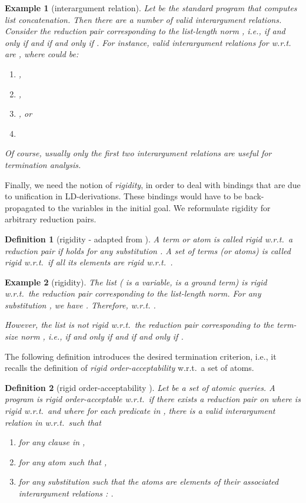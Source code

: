 \documentclass[envcountsame]{tlp}
\newcounter{ex:der-lastsymconsctr}
\newtheorem{definition}{Definition}
\newtheorem{example}{Example}
\begin{document}
\begin{example}[interargument relation]\label{exam:interagr}
Let  be the 
standard  program that computes list concatenation. Then
there are a number of valid interargument
relations. Consider the reduction
pair  corresponding to the list-length norm ,
i.e.,  if and only if  and  if and only if
.
For instance, valid 
interargument relations for  w.r.t.  are 
 , where  could be:
\begin{enumerate}
\item[-] ,
\item[-] ,
\item[-] , or
\item[-] 
\end{enumerate}
Of course, usually only the first two interargument relations
are useful for termination analysis.
{\hfill{}}
\end{example}
 

Finally, we need the notion of \emph{rigidity}, in order to deal with
bindings that are due to 
unification in LD-derivations. These bindings would have to be back-propagated
to the variables in the initial goal. We reformulate rigidity for arbitrary reduction
pairs.

\begin{definition}[rigidity - adapted from \cite{DeSchreyeSerebrenik01}] \label{def:rigidity}
A term or atom  is called \emph{rigid}
w.r.t.\ a reduction pair  if  holds for any
substitution . A set of terms (or atoms)  is called \emph{rigid}
w.r.t.\  if all its elements are rigid w.r.t.\ .
\end{definition}

\begin{example}[rigidity]\label{exam:rigidity}
The list  ( is a variable,  is a ground term) is rigid w.r.t.\ the reduction
pair  corresponding to the list-length norm.
For any substitution
, we have . Therefore,
 w.r.t. .

However, the list  is not rigid w.r.t.\ the reduction pair 
corresponding to the term-size norm , i.e., 
if and only if  and  if and only if . 
{\hfill{}}
\end{example}

The following definition introduces the desired termination criterion, i.e., it
recalls the definition of \emph{rigid order-acceptability} w.r.t.\ a set of atoms.


\begin{definition}[rigid order-acceptability
\cite{DeSchreyeSerebrenik01}]\label{def:rigidacceptability} 
Let  be a set of atomic queries. A  program  is
\emph{rigid order-acceptable} w.r.t.\  if there exists a reduction pair 
on  
where  is rigid w.r.t.\  and
where for each predicate  in , there is a valid  interargument
relation  in 
w.r.t.\  such that
\begin{enumerate}
\item[-] for any clause  in ,
\item[-] for any atom  such that ,
\item[-] for any substitution  such that the atoms
 are elements of their associated
interargument relations : 
                    \center{}.
\end{enumerate}
\end{definition}
\end{document}
